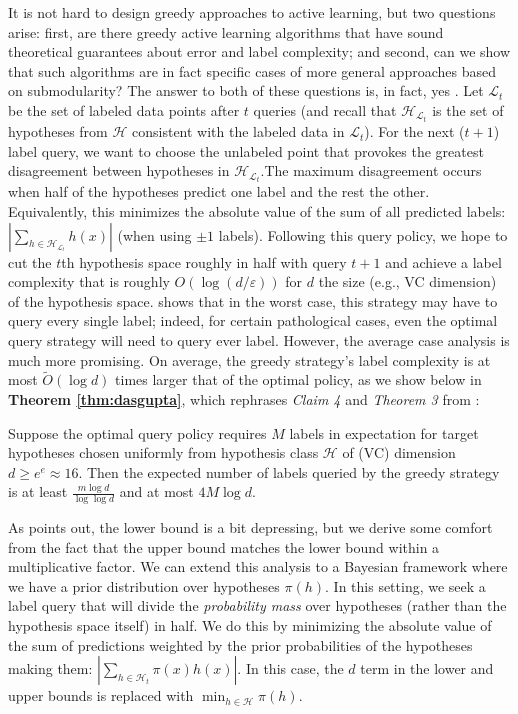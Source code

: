 It is not hard to design greedy approaches to active learning, but two questions arise: first, are there greedy active learning algorithms that have sound theoretical guarantees about error and label complexity; and second, can we show that such algorithms are in fact specific cases of more general approaches based on submodularity? The answer to both of these questions is, in fact, yes \cite{dasgupta2004}. Let $\mathcal{L}_t$ be the set of labeled data points after $t$ queries (and recall that $\mathcal{H}_{\mathcal{L}_t}$ is the set of hypotheses from $\mathcal{H}$ consistent with the labeled data in $\mathcal{L}_t$). For the next ($t+1$) label query, we want to choose the unlabeled point that provokes the greatest disagreement between hypotheses in $\mathcal{H}_{\mathcal{L}_t}$.The maximum disagreement occurs when half of the hypotheses predict one label and the rest the other. Equivalently, this minimizes the absolute value of the sum of all predicted labels: $| \sum_{h \in \mathcal{H}_{\mathcal{L}_t}} h(x)|$ (when using $\pm1$ labels). Following this query policy, we hope to cut the $t$th hypothesis space roughly in half with query $t+1$ and achieve a label complexity that is roughly $O(\log (d/\varepsilon))$ for $d$ the size (e.g., VC dimension) of the hypothesis space. \cite{dasgupta2004} shows that in the worst case, this strategy may have to query every single label; indeed, for certain pathological cases, even the optimal query strategy will need to query ever label. However, the average case analysis is much more promising. On average, the greedy strategy's label complexity is at most $\widetilde{O}(\log d)$ times larger that of the optimal policy, as we show below in \textbf{Theorem \ref{thm:dasgupta}}, which rephrases \textit{Claim 4} and \textit{Theorem 3} from \cite{dasgupta2004}:\\

\begin{theorem}
\label{thm:dasgupta}
Suppose the optimal query policy requires $M$ labels in expectation for target hypotheses chosen uniformly from hypothesis class $\mathcal{H}$ of (VC) dimension $d \geq e^e \approx 16$. Then the expected number of labels queried by the greedy strategy is at least $\frac{m \log d}{\log \log d}$ and at most $4 M \log d$.
\end{theorem}

As \cite{dasgupta2004} points out, the lower bound is a bit depressing, but we derive some comfort from the fact that the upper bound matches the lower bound within a multiplicative factor. We can extend this analysis to a Bayesian framework where we have a prior distribution over hypotheses $\pi(h)$. In this setting, we seek a label query that will divide the \textit{probability mass} over hypotheses (rather than the hypothesis space itself) in half. We do this by minimizing the absolute value of the sum of predictions weighted by the prior probabilities of the hypotheses making them: $| \sum_{h \in \mathcal{H}_t} \pi(x) h(x)|$. In this case, the $d$ term in the lower and upper bounds is replaced with $\min_{h \in \mathcal{H}} \pi(h)$.

